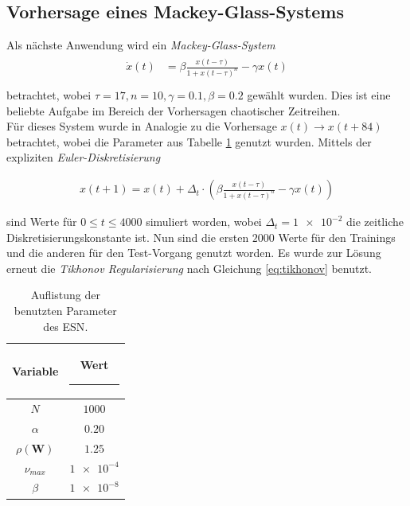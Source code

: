 \clearpage

\subsection{Vorhersage eines Mackey-Glass-Systems}
\label{sec:mackey_glass}
Als nächste Anwendung wird ein \textit{Mackey-Glass-System}
\begin{align}
\label{eq:application_mackey_glass_pde}
\begin{split}
\dot{x}(t) &= \beta \frac{x(t-\tau)}{1+x(t-\tau)^n}-\gamma x(t)\\
\end{split}
\end{align}
betrachtet, wobei $\tau = 17, n=10, \gamma=0.1, \beta = 0.2$ gewählt wurden. Dies ist eine beliebte Aufgabe im Bereich der Vorhersagen chaotischer Zeitreihen.\\
Für dieses System wurde in Analogie zu  \citep{caraballo2014} die Vorhersage $x(t) \rightarrow x(t+84)$ betrachtet, wobei die Parameter aus Tabelle \ref{tab:application_mackeyglass} genutzt wurden. Mittels der expliziten \textit{Euler-Diskretisierung} 

\begin{align}
x(t+1) = x(t) + \Delta_t \cdot \left(\beta \frac{x(t-\tau)}{1+x(t-\tau)^n}-\gamma x(t)  \right)
\end{align}

sind Werte für $0 \leq t \leq 4000$ simuliert worden, wobei $\Delta_t=\num{1e-2}$ die zeitliche Diskretisierungskonstante ist. Nun sind die ersten $2000$ Werte für den Trainings und die anderen für den Test-Vorgang genutzt worden. Es wurde zur Lösung erneut die \textit{Tikhonov Regularisierung} nach Gleichung \ref{eq:tikhonov} benutzt.

\begin{table}[H]
	\centering
		\begin{tabular}{|c|c|}
		\rule[-1ex]{0pt}{3.5ex} Variable & \hspace{4ex} Wert \rule[-1ex]{4ex}{0pt}\\ 
		\hline \hline 
		\rule[-1ex]{0pt}{3.5ex} $N$ & $1000$ \\ 
		\hline 
		\rule[-1ex]{0pt}{3.5ex} $\alpha$ & $0.20$ \\ 
		\hline 
		\rule[-1ex]{0pt}{3.5ex} $\rho(\mathbf{W})$ & $1.25$ \\ 
		\hline 
		\rule[-1ex]{0pt}{3.5ex} $\nu_{max}$ & $\num{1e-4}$ \\ 
		\hline 
		\rule[-1ex]{0pt}{3.5ex} $\beta$ & $\num{1e-8}$ \\ 
		\hline 
	\end{tabular} 
	\caption{Auflistung der benutzten Parameter des \textsc{ESN}.}
\label{tab:application_mackeyglass}
\end{table}


